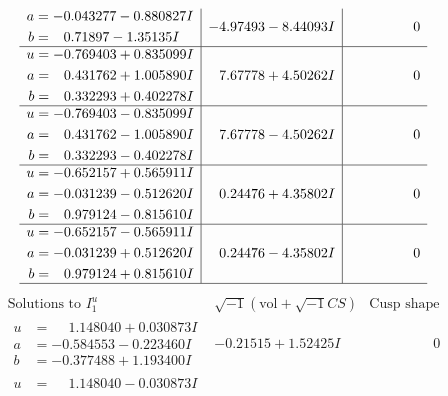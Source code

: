 \documentclass[1p]{elsarticle_modified}
\theoremstyle{definition}
\newcommand{\I}{\sqrt{-1}}
\begin{document}
$$\begin{array}{c|c|c}
\begin{aligned}
a &= -0.043277 - 0.880827 I \\
b &= \phantom{-}0.71897 - 1.35135 I\end{aligned}
 & -4.97493 - 8.44093 I & \phantom{-0.000000 } 0 \\ \hline\begin{aligned}
u &= -0.769403 + 0.835099 I \\
a &= \phantom{-}0.431762 + 1.005890 I \\
b &= \phantom{-}0.332293 + 0.402278 I\end{aligned}
 & \phantom{-}7.67778 + 4.50262 I & \phantom{-0.000000 } 0 \\ \hline\begin{aligned}
u &= -0.769403 - 0.835099 I \\
a &= \phantom{-}0.431762 - 1.005890 I \\
b &= \phantom{-}0.332293 - 0.402278 I\end{aligned}
 & \phantom{-}7.67778 - 4.50262 I & \phantom{-0.000000 } 0 \\ \hline\begin{aligned}
u &= -0.652157 + 0.565911 I \\
a &= -0.031239 - 0.512620 I \\
b &= \phantom{-}0.979124 - 0.815610 I\end{aligned}
 & \phantom{-}0.24476 + 4.35802 I & \phantom{-0.000000 } 0 \\ \hline\begin{aligned}
u &= -0.652157 - 0.565911 I \\
a &= -0.031239 + 0.512620 I \\
b &= \phantom{-}0.979124 + 0.815610 I\end{aligned}
 & \phantom{-}0.24476 - 4.35802 I & \phantom{-0.000000 } 0\\
 \hline 
 \end{array}$$\newpage$$\begin{array}{c|c|c}  
\text{Solutions to }I^u_{1}& \I (\text{vol} + \sqrt{-1}CS) & \text{Cusp shape}\\
 \hline 
\begin{aligned}
u &= \phantom{-}1.148040 + 0.030873 I \\
a &= -0.584553 - 0.223460 I \\
b &= -0.377488 + 1.193400 I\end{aligned}
 & -0.21515 + 1.52425 I & \phantom{-0.000000 } 0 \\ \hline\begin{aligned}
u &= \phantom{-}1.148040 - 0.030873 I \\

\end{aligned}
\end{array}$$
\end{document}
